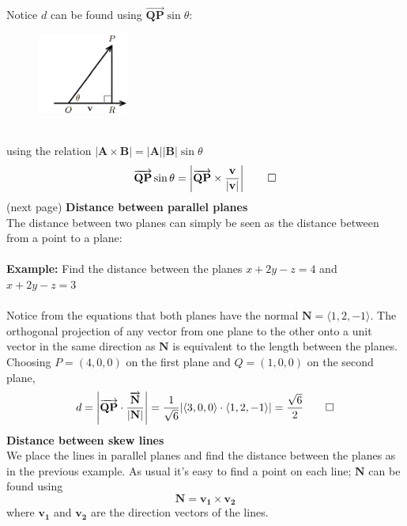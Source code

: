 \documentclass{report}
\begin{document}
Notice $d$ can be found using $\overrightarrow{\mathbf{QP}}\sin\theta$:
\begin{figure}[h]
\includegraphics[width=3cm]{Capture84}\\
\centering
\end{figure}\\
using the relation $|\mathbf{A\times B}|=\mathbf{|A||B|}\sin\theta$
\begin{equation*}
\overrightarrow{\mathbf{QP}}\sin\theta
=\left|\overrightarrow{\mathbf{QP}}\times\frac{\mathbf{v}}{|\mathbf{v}|}\right|\qed
\end{equation*}
(next page)
\newpage
\noindent\textbf{Distance between parallel planes}\\
The distance between two planes can simply be seen as the distance between from a point
to a plane:\\
\vspace{1mm}\\
\textbf{Example:} Find the distance between the planes
$x+2y-z=4$ and $x+2y-z=3$\\
\vspace{1mm}\\
Notice from the equations that both planes have the normal $\mathbf{N}=\langle 1,2,-1\rangle$. 
The orthogonal projection of any vector from one plane to the other onto 
a unit vector in the same direction as $\mathbf{N}$ is equivalent to the length between
the planes. Choosing $P=(4,0,0)$ on the first plane and $Q=(1,0,0)$ on the second plane,
\begin{equation*}
d=\left|\overrightarrow{\mathbf{QP}}\cdot
\frac{\overrightarrow{\mathbf{N}}}{|\mathbf{N}|}\right|
=\frac{1}{\sqrt{6}}|\langle 3,0,0\rangle\cdot\langle 1,2,-1\rangle|=\frac{\sqrt{6}}{2}\qed
\end{equation*}
\textbf{Distance between skew lines}\\
We place the lines in parallel planes and find the distance between the planes as in the 
previous example. As usual it's easy to find a point on each line; $\mathbf{N}$ can be found using
\begin{equation*}
\mathbf{N=v_1\times v_2}
\end{equation*}
where $\mathbf{v_1}$ and $\mathbf{v_2}$ are the direction vectors of the lines.
\newpage
\end{document}
